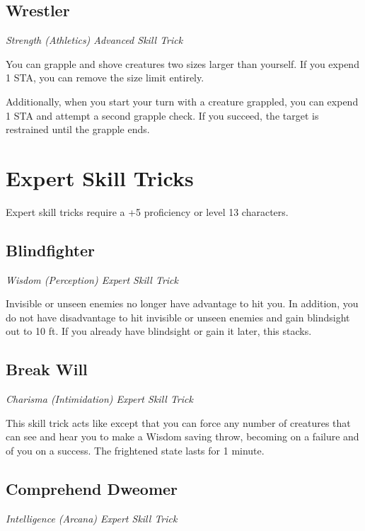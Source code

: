 \subsection{Wrestler}

\textit{Strength (Athletics) Advanced Skill Trick}

You can grapple and shove creatures two sizes larger than yourself. If you expend 1 STA, you can remove the size limit entirely.

Additionally, when you start your turn with a creature grappled, you can expend 1 STA and attempt a second grapple check. If you succeed, the target is restrained until the grapple ends.

\section{Expert Skill Tricks}
\label{sec:skill-tricks-expert}

Expert skill tricks require a +5 proficiency or level 13 characters.

\subsection{Blindfighter}

\textit{Wisdom (Perception) Expert Skill Trick}

Invisible or unseen enemies no longer have advantage to hit you. In addition, you do not have disadvantage to hit invisible or unseen enemies and gain blindsight out to 10 ft. If you already have blindsight or gain it later, this stacks.

\subsection{Break Will}

\textit{Charisma (Intimidation) Expert Skill Trick}

This skill trick acts like  except that you can force any number of creatures that can see and hear you to make a Wisdom saving throw, becoming  on a failure and  of you on a success. The frightened state lasts for 1 minute.

\subsection{Comprehend Dweomer}

\textit{Intelligence (Arcana) Expert Skill Trick}

